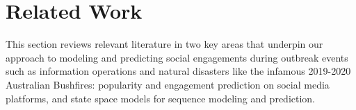 
  

\section{Related Work}
This section reviews relevant literature in two key areas that underpin our approach to modeling and predicting social engagements during outbreak events such as information operations and natural disasters like the infamous 2019-2020 Australian Bushfires:
popularity and engagement prediction on social media platforms, and
state space models for sequence modeling and prediction.


%
%

